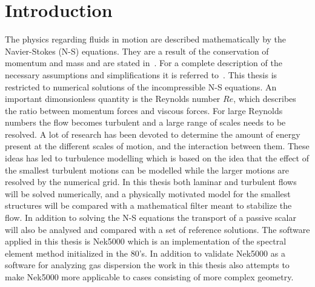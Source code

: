 
\chapter{Introduction} %

\label{introduction} %




The physics regarding fluids in motion are described mathematically by the Navier-Stokes (N-S) equations. 
They are a result of the conservation of momentum and mass and are stated in~. For a complete 
description of the necessary assumptions and simplifications it is referred to~\cite{White}.  
This thesis is restricted to numerical solutions of the incompressible N-S equations.
An important dimonsionless quantity is the Reynolds number $Re$, which describes the ratio between 
momentum forces and viscous forces. For large Reynolds numbers the flow becomes turbulent and a 
large range of scales needs to be resolved. A lot of research has been devoted to determine the
amount of energy present at the different scales of motion, and the interaction between them. 
These ideas has led to turbulence modelling which is based on the 
idea that the effect of the smallest turbulent motions can be modelled while 
the larger motions are resolved by the numerical grid. 
In this thesis both laminar and turbulent flows will be solved numerically, 
and a physically motivated model for the smallest structures will be compared
with a mathematical filter meant to stabilize the flow.
In addition to solving the N-S equations the 
transport of a passive scalar will also be analysed and compared with a set of reference solutions. 
The software applied in this thesis is Nek5000 which is an implementation of the spectral element method initialized in the 80's.
In addition to validate Nek5000 as a software for analyzing gas dispersion the work in this thesis 
also attempts to make Nek5000 more applicable to cases consisting of more complex geometry. 


